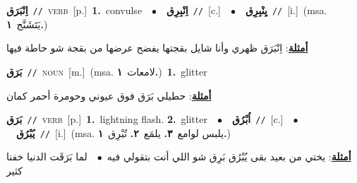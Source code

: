 \documentclass[10pt,a4paper,twoside]{article} %
\begin{document}
\begin{multicols}{2}
{\setlength\topsep{0pt}\textbf{\foreignlanguage{arabic}{اِنْبَرَق}}\ {\color{gray}\texttt{//}\color{black}}\ \textsc{verb}\ [p.]\ \textbf{1.}~convulse\ \ $\bullet$\ \ \setlength\topsep{0pt}\textbf{\foreignlanguage{arabic}{اِنْبِرِق}}\ {\color{gray}\texttt{//}\color{black}}\ [c.]\ \ $\bullet$\ \ \setlength\topsep{0pt}\textbf{\foreignlanguage{arabic}{يِنْبِرِق}}\ {\color{gray}\texttt{//}\color{black}}\ [i.]\ \color{gray}(msa. \foreignlanguage{arabic}{يَتَشَنَّج}~\foreignlanguage{arabic}{\textbf{١.}})\color{black}\  \begin{flushright}\color{gray}\foreignlanguage{arabic}{\textbf{\underline{\foreignlanguage{arabic}{أمثلة}}}: اِنْبَرَق ظهري وأنا شايل بقجتها يفضح عرضها من بقجة شو حاطة فيها}\end{flushright}\color{black}} \vspace{2mm}

{\setlength\topsep{0pt}\textbf{\foreignlanguage{arabic}{بَرَق}}\ {\color{gray}\texttt{//}\color{black}}\ \textsc{noun}\ [m.]\ \color{gray}(msa. \foreignlanguage{arabic}{لامعات}~\foreignlanguage{arabic}{\textbf{١.}})\color{black}\ \textbf{1.}~glitter\  \begin{flushright}\color{gray}\foreignlanguage{arabic}{\textbf{\underline{\foreignlanguage{arabic}{أمثلة}}}: حطيلي بَرَق فوق عيوني وحومرة أحمر كمان}\end{flushright}\color{black}} \vspace{2mm}

{\setlength\topsep{0pt}\textbf{\foreignlanguage{arabic}{بَرَق}}\ {\color{gray}\texttt{//}\color{black}}\ \textsc{verb}\ [p.]\ \textbf{1.}~lightning flash.  \textbf{2.}~glitter\ \ $\bullet$\ \ \setlength\topsep{0pt}\textbf{\foreignlanguage{arabic}{اُبْرُق}}\ {\color{gray}\texttt{//}\color{black}}\ [c.]\ \ $\bullet$\ \ \setlength\topsep{0pt}\textbf{\foreignlanguage{arabic}{يُبْرُق}}\ {\color{gray}\texttt{//}\color{black}}\ [i.]\ \color{gray}(msa. \foreignlanguage{arabic}{يلبس لوامع}~\foreignlanguage{arabic}{\textbf{٣.}}  \foreignlanguage{arabic}{يلمَع}~\foreignlanguage{arabic}{\textbf{٢.}}  \foreignlanguage{arabic}{تُبْرِق}~\foreignlanguage{arabic}{\textbf{١.}})\color{black}\  \begin{flushright}\color{gray}\foreignlanguage{arabic}{\textbf{\underline{\foreignlanguage{arabic}{أمثلة}}}: يختي من بعيد بقى يُبْرُق بَرِق شو اللي أنت بتقولي فيه\ $\bullet$\ \  لما بَرَقَت الدنيا خفنا كثير}\end{flushright}\color{black}} \vspace{2mm}


\end{multicols}
\end{document}
